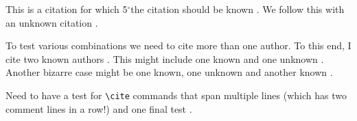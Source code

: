 ﻿\documentclass{article}
\renewcommand{\deg}{\ensuremath{^\circ}} %
\begin{document}
This is a citation for which 5\deg the citation should be known \cite{known}.
We follow this with an unknown citation \cite{unknown}.

To test various combinations we need to cite more than one author.  To this
end, I cite two known authors \cite{known,known2}.  This might include one
known and one unknown \cite{unknown,known}.  Another bizarre case might be
one known, one unknown and another known \cite{known,unknown,known2}.

Need to have a test for \verb#\cite# commands that span multiple lines \cite{
known,%
known2} (which has two comment lines in a row!) and one final test \cite{%
known, %
known2%
}.



\end{document}
